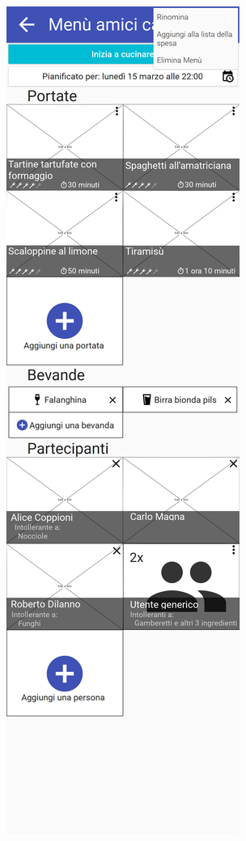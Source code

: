 \begin{figure}[H]
\begin{minipage}{.49\textwidth}
		\includegraphics[width=\textwidth]{img/wireframe/men_amici_calcetto_pallini_menu.png}
	\end{minipage}
\end{figure}
